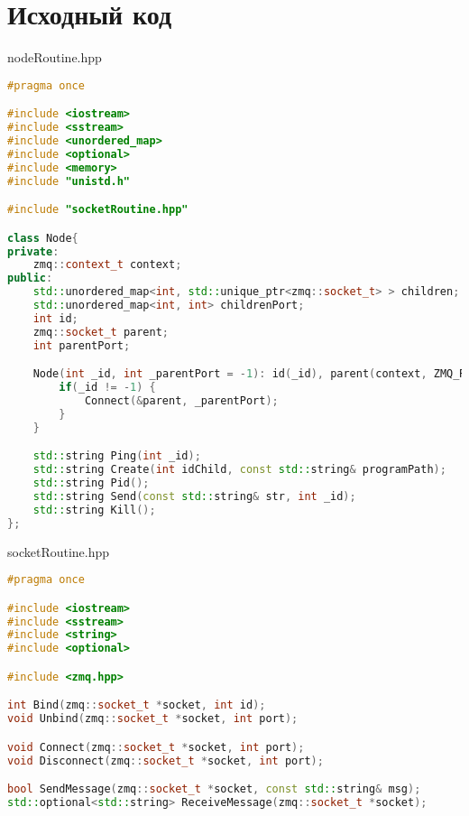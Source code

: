\documentclass[a4paper, 12pt]{article}
\begin{document}
\newpage

\section{Исходный код}
nodeRoutine.hpp
\begin{lstlisting}[language=C++]
#pragma once

#include <iostream>
#include <sstream>
#include <unordered_map>
#include <optional>
#include <memory>
#include "unistd.h"

#include "socketRoutine.hpp"

class Node{
private:
    zmq::context_t context;
public:
    std::unordered_map<int, std::unique_ptr<zmq::socket_t> > children;
    std::unordered_map<int, int> childrenPort;
    int id;
    zmq::socket_t parent;
    int parentPort;

    Node(int _id, int _parentPort = -1): id(_id), parent(context, ZMQ_REP), parentPort(_parentPort) {
        if(_id != -1) {
            Connect(&parent, _parentPort);
        }
    }

    std::string Ping(int _id);
    std::string Create(int idChild, const std::string& programPath);
    std::string Pid();
    std::string Send(const std::string& str, int _id);
    std::string Kill();
};
\end{lstlisting}

socketRoutine.hpp
\begin{lstlisting}[language=C++]
#pragma once

#include <iostream>
#include <sstream>
#include <string>
#include <optional>

#include <zmq.hpp>

int Bind(zmq::socket_t *socket, int id);
void Unbind(zmq::socket_t *socket, int port);

void Connect(zmq::socket_t *socket, int port);
void Disconnect(zmq::socket_t *socket, int port);

bool SendMessage(zmq::socket_t *socket, const std::string& msg);
std::optional<std::string> ReceiveMessage(zmq::socket_t *socket);
\end{lstlisting}
\end{document}
